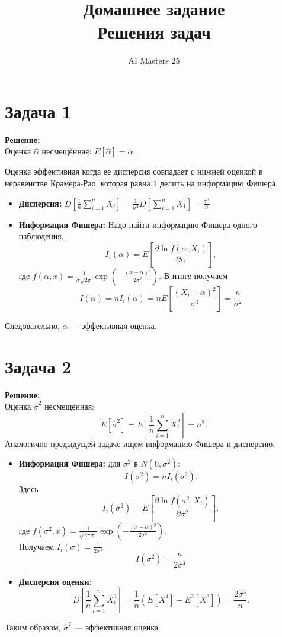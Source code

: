 \documentclass{article}
\title{Домашнее задание \\ \large Решения задач}
\author{AI Masters 25}
\date{}
\begin{document}
\maketitle

\section*{Задача 1}

\noindent \textbf{Решение:}\\
Оценка \(\hat{\alpha}\) несмещённая: \(E[\hat{\alpha}] = \alpha\).

Оценка эффективная когда ее дисперсия совпадает с нижней оценкой в неравенстве Крамера-Рао, которая
равна $1$ делить на информацию Фишера.
\begin{itemize}
  \item \textbf{Дисперсия:} \(D\left[\frac 1 n \sum\limits_{i=1}^{n} X_{i}\right] = \frac 1 {n^{2}}D\left[\sum\limits_{i=1}^{n}X_{1}\right] = \frac{\sigma^{2}}{n}\)
  \item \textbf{Информация Фишера:} Надо найти информацию Фишера одного наблюдения.
        \[I_{i}(\alpha) = E\left[\frac{\partial \ln{f(\alpha,X_{i})}}{\partial \alpha}\right],\]
        где \(f(\alpha, x) = \frac 1 {\sigma\sqrt{2\pi}}\exp\left(-\frac{{(x-\alpha)}^{2}}{2\sigma^{2}}\right)\).
        В итоге получаем \[I(\alpha) = nI_{i}(\alpha) = n E\left[\frac{{(X_{i}-\alpha)}^{2}}{\sigma^{4}}\right] =
        \frac n {\sigma^{2}}\]
\end{itemize}
Следовательно, \(\hat{\alpha}\) — эффективная оценка.

\section*{Задача 2}

\noindent \textbf{Решение:} \\
Оценка \(\hat{\sigma}^2\) несмещённая:
\[
E[\hat{\sigma}^2] = E\left[\frac{1}{n} \sum_{i=1}^n X_i^2\right] = \sigma^2.
\]
Аналогично предыдущей задаче ищем информацию Фишера и дисперсию.
\begin{itemize}
  \item \textbf{Информация Фишера:} для \(\sigma^2\) в \(N(0, \sigma^2)\):
\[
I(\sigma^2) = nI_{i}(\sigma^{2}).
\]
        Здесь \[I_{i}(\sigma^{2}) = E\left[\frac{\partial \ln{f(\sigma^{2},X_{i})}}{\partial \sigma^{2}}\right],\]
        где \(f(\sigma^{2}, x) = \frac 1 {\sqrt{2\pi\sigma^{2}}}\exp\left(-\frac{{(x-\alpha)}^{2}}{2\sigma^{2}}\right)\).\\
        Получаем \(I_{i}(\sigma) = \frac 1 {2\sigma^{4}}\).
        \[I(\sigma^{2}) = \frac{n}{2\sigma^{4}}\]
  \item \textbf{Дисперсия оценки}:
\[
        D\left[\frac{1}{n} \sum_{i=1}^n X_i^2\right] = \frac 1 {n} \left(E\left[X^{4}\right] - E^{2}\left[X^{2}\right]\right)
        = \frac{2\sigma^{4}}{n}.
\]
\end{itemize}
Таким образом, \(\hat{\sigma}^2\) — эффективная оценка.
\end{document}
